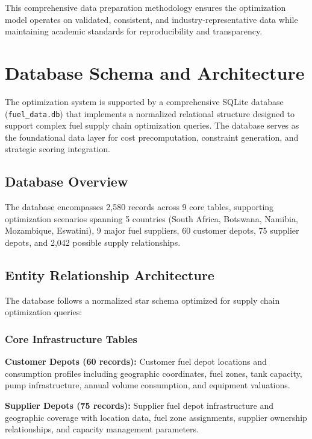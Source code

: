 
This comprehensive data preparation methodology ensures the optimization model operates on validated, consistent, and industry-representative data while maintaining academic standards for reproducibility and transparency.

\section{Database Schema and Architecture}



The optimization system is supported by a comprehensive SQLite database (\texttt{fuel\_data.db}) that implements a normalized relational structure designed to support complex fuel supply chain optimization queries. The database serves as the foundational data layer for cost precomputation, constraint generation, and strategic scoring integration.

\subsection{Database Overview}
The database encompasses 2,580 records across 9 core tables, supporting optimization scenarios spanning 5 countries (South Africa, Botswana, Namibia, Mozambique, Eswatini), 9 major fuel suppliers, 60 customer depots, 75 supplier depots, and 2,042 possible supply relationships.

\subsection{Entity Relationship Architecture}
The database follows a normalized star schema optimized for supply chain optimization queries:



\subsubsection{Core Infrastructure Tables}
\textbf{Customer Depots (60 records):} Customer fuel depot locations and consumption profiles including geographic coordinates, fuel zones, tank capacity, pump infrastructure, annual volume consumption, and equipment valuations.

\textbf{Supplier Depots (75 records):} Supplier fuel depot infrastructure and geographic coverage with location data, fuel zone assignments, supplier ownership relationships, and capacity management parameters.

